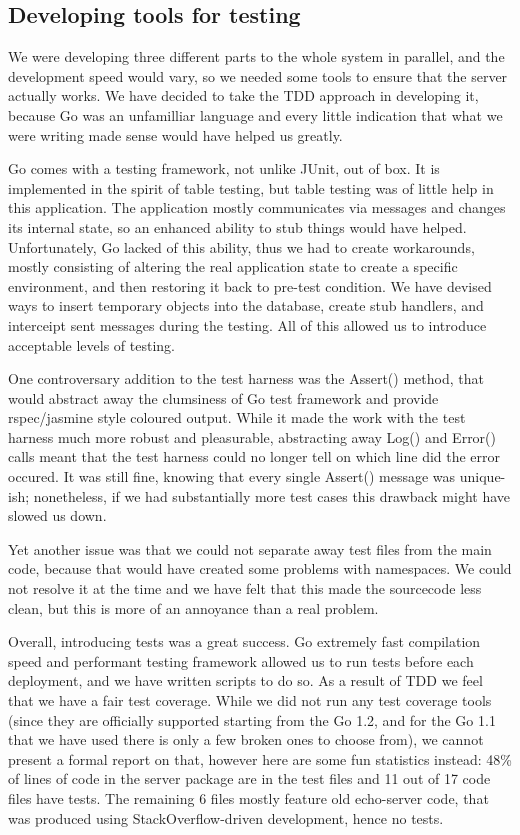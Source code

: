 \documentclass{l3proj}
\begin{document}
\subsection{Developing tools for testing}

We were developing three different parts to the whole system in parallel, and the development speed would vary, so we needed some tools to ensure that the server actually works. We have decided to take the TDD approach in developing it, because Go was an unfamilliar language and every little indication that what we were writing made sense would have helped us greatly.

Go comes with a testing framework, not unlike JUnit, out of box. It is implemented in the spirit of table testing, but table testing was of little help in this application. The application mostly communicates via messages and changes its internal state, so an enhanced ability to stub things would have helped. Unfortunately, Go lacked of this ability, thus we had to create workarounds, mostly consisting of altering the real application state to create a specific environment, and then restoring it back to pre-test condition. We have devised ways to insert temporary objects into the database, create stub handlers, and interceipt sent messages during the testing. All of this allowed us to introduce acceptable levels of testing.

One controversary addition to the test harness was the Assert() method, that would abstract away the clumsiness of Go test framework and provide rspec/jasmine style coloured output. While it made the work with the test harness much more robust and pleasurable, abstracting away Log() and Error() calls meant that the test harness could no longer tell on which line did the error occured. It was still fine, knowing that every single Assert() message was unique-ish; nonetheless, if we had substantially more test cases this drawback might have slowed us down.

Yet another issue was that we could not separate away test files from the main code, because that would have created some problems with namespaces. We could not resolve it at the time and we have felt that this made the sourcecode less clean, but this is more of an annoyance than a real problem.

Overall, introducing tests was a great success. Go extremely fast compilation speed and performant testing framework allowed us to run tests before each deployment, and we have written scripts to do so. As a result of TDD we feel that we have a fair test coverage. While we did not run any test coverage tools (since they are officially supported starting from the Go 1.2, and for the Go 1.1 that we have used there is only a few broken ones to choose from), we cannot present a formal report on that, however here are some fun statistics instead: 48\% of lines of code in the server package are in the test files and 11 out of 17 code files have tests. The remaining 6 files mostly feature old echo-server code, that was produced using StackOverflow-driven development, hence no tests. 
\end{document}
